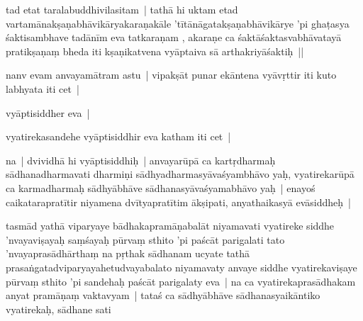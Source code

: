 \documentclass[article,12pt,a4paper]{memoir}%
\newcounter{parCount}
\begin{document}
	  \pstart \leavevmode%
	\label{thakur75-70.11}tad etat taralabuddhivilasitam | tathā hi uktam etad vartamānakṣaṇabhāvikāryakaraṇakāle 'tītānāgatakṣaṇabhāvikārye 'pi ghaṭasya śaktisambhave tadānīm eva tatkaraṇam , akaraṇe ca śaktāśaktasvabhāvatayā pratikṣaṇaṃ bheda iti kṣaṇikatvena vyāptaiva sā arthakriyāśaktiḥ || 
	{}
	\pend%
      

	  \pstart \leavevmode%
	\label{thakur75-70.15}nanv evam anvayamātram astu | vipakṣāt punar ekāntena vyāvṛttir iti kuto labhyata iti cet | 
	{}
	\pend%
      

	  \pstart \leavevmode%
	\label{thakur75-70.16}vyāptisiddher eva |
	{}
	\pend%
      

	  \pstart \leavevmode%
	\label{thakur75-70.16a}vyatirekasandehe vyāptisiddhir eva katham iti cet | 
	{}
	\pend%
      

	  \pstart \leavevmode%
	\label{thakur75-70.17}na | dvividhā hi vyāptisiddhiḥ | anvayarūpā ca kartṛdharmaḥ sādhanadharmavati dharmiṇi sādhyadharmasyāvaśyambhāvo yaḥ, vyatirekarūpā ca karmadharmaḥ sādhyābhāve sādhanasyāvaśyamabhāvo yaḥ | enayoś caikatarapratītir niyamena dvītyapratītim ākṣipati, anyathaikasyā evāsiddheḥ |
	{}
	\pend%
      

	  \pstart \leavevmode%
	\label{thakur75-70.20}tasmād yathā viparyaye bādhakapramāṇabalāt niyamavati vyatireke siddhe 'nvayaviṣayaḥ saṃśayaḥ pūrvaṃ sthito 'pi paścāt parigalati tato 'nvayaprasādhārthaṃ na pṛthak sādhanam ucyate tathā prasaṅgatadviparyayahetudvayabalato niyamavaty anvaye siddhe vyatirekaviṣaye pūrvaṃ sthito 'pi sandehaḥ paścāt parigalaty eva | na ca vyatirekaprasādhakam anyat pramāṇaṃ vaktavyam | tataś ca sādhyābhāve sādhanasyaikāntiko vyatirekaḥ, sādhane sati
	{}
	\pend%
      
\end{document}
